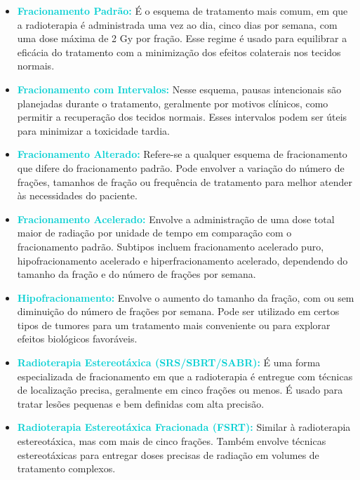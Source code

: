 \documentclass[11pt,a4paper]{article}
\begin{document}
	\begin{itemize}
		\item \textcolor{DarkTurquoise}{\textbf{Fracionamento Padrão:}} É o esquema de tratamento mais comum, em que a radioterapia é administrada uma vez ao dia, cinco dias por semana, com uma dose máxima de 2 Gy por fração. Esse regime é usado para equilibrar a eficácia do tratamento com a minimização dos efeitos colaterais nos tecidos normais.

		\item \textcolor{DarkTurquoise}{\textbf{Fracionamento com Intervalos:}} Nesse esquema, pausas intencionais são planejadas durante o tratamento, geralmente por motivos clínicos, como permitir a recuperação dos tecidos normais. Esses intervalos podem ser úteis para minimizar a toxicidade tardia.

		\item \textcolor{DarkTurquoise}{\textbf{Fracionamento Alterado:}} Refere-se a qualquer esquema de fracionamento que difere do fracionamento padrão. Pode envolver a variação do número de frações, tamanhos de fração ou frequência de tratamento para melhor atender às necessidades do paciente.

		\item \textcolor{DarkTurquoise}{\textbf{Fracionamento Acelerado:}} Envolve a administração de uma dose total maior de radiação por unidade de tempo em comparação com o fracionamento padrão. Subtipos incluem fracionamento acelerado puro, hipofracionamento acelerado e hiperfracionamento acelerado, dependendo do tamanho da fração e do número de frações por semana.

		\item \textcolor{DarkTurquoise}{\textbf{Hipofracionamento:}} Envolve o aumento do tamanho da fração, com ou sem diminuição do número de frações por semana. Pode ser utilizado em certos tipos de tumores para um tratamento mais conveniente ou para explorar efeitos biológicos favoráveis.

		\item \textcolor{DarkTurquoise}{\textbf{Radioterapia Estereotáxica (SRS/SBRT/SABR):}} É uma forma especializada de fracionamento em que a radioterapia é entregue com técnicas de localização precisa, geralmente em cinco frações ou menos. É usado para tratar lesões pequenas e bem definidas com alta precisão.

		\item \textcolor{DarkTurquoise}{\textbf{Radioterapia Estereotáxica Fracionada (FSRT):}} Similar à radioterapia estereotáxica, mas com mais de cinco frações. Também envolve técnicas estereotáxicas para entregar doses precisas de radiação em volumes de tratamento complexos.


\end{itemize}
\end{document}
